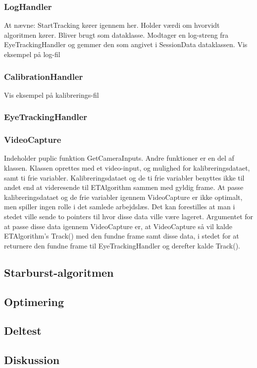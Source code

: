 \documentclass[rapport.tex]{subfiles}
\begin{document}
	\subsubsection{LogHandler}
	At nævne: StartTracking kører igennem her. Holder værdi om hvorvidt algoritmen kører. Bliver brugt som dataklasse. 
	Modtager en log-streng fra EyeTrackingHandler og gemmer den som angivet i SessionData dataklassen. 
	Vis eksempel på log-fil
	
	\subsubsection{CalibrationHandler}
	Vis eksempel på kalibrerings-fil
	
	\subsubsection{EyeTrackingHandler}
	
	
	\subsubsection{VideoCapture}
	Indeholder puplic funktion GetCameraInputs. 
	Andre funktioner er en del af klassen. Klassen oprettes med et video-input, og mulighed for kalibreringsdataet, samt ti frie variabler. Kalibreringsdataet og de ti frie variabler benyttes ikke til andet end at videresende til ETAlgorithm sammen med gyldig frame. 
	At passe kalibreringsdataet og de frie variabler igennem VideoCapture er ikke optimalt, men spiller ingen rolle i det samlede arbejdslæs. Det kan forestilles at man i stedet ville sende to pointers til hvor disse data ville være lageret. Argumentet for at passe disse data igennem VideoCapture er, at VideoCapture så vil kalde ETAlgorithm's Track() med den fundne frame samt disse data, i stedet for at returnere den fundne frame til EyeTrackingHandler og derefter kalde Track(). 
		

	\subsection{Starburst-algoritmen}
	\subsection{Optimering}
	\subsection{Deltest}
	\subsection{Diskussion}
		
\end{document}
